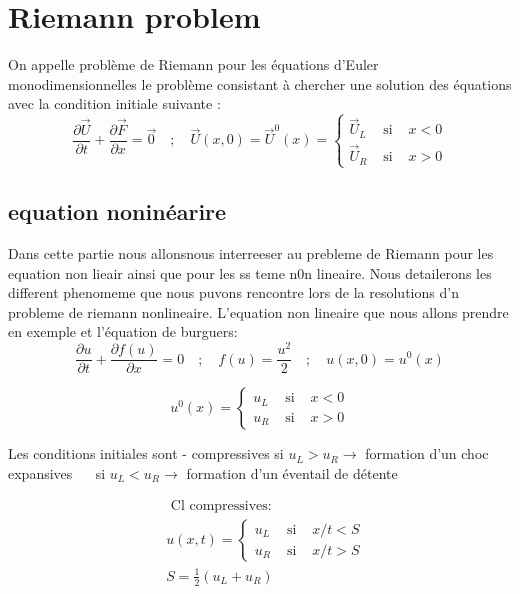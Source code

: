 \section{Riemann problem}

On appelle problème de Riemann pour les équations d'Euler monodimensionnelles le problème consistant à chercher une solution des équations avec la condition initiale suivante :
\begin{equation}
\frac{\partial \vec{U}}{\partial t}+\frac{\partial \vec{F}}{\partial x}=\overrightarrow{0} \quad ; \quad \vec{U}(x, 0)=\vec{U}^{0}(x)=\left\{\begin{array}{lll}
\vec{U}_{L} & \text { si } & x<0 \\
\vec{U}_{R} & \text { si } & x>0
\end{array}\right.
\end{equation}
\subsection{equation noninéarire}
Dans cette partie nous allonsnous interreeser au prebleme de Riemann pour les equation non lieair ainsi que pour les ss teme n0n lineaire. Nous detailerons les different phenomeme que nous puvons rencontre lors de la resolutions d'n probleme de riemann nonlineaire. L'equation non lineaire que nous allons prendre en exemple et l'équation de burguers:
\begin{equation}
\frac{\partial u}{\partial t}+\frac{\partial f(u)}{\partial x}=0 \quad ; \quad f(u)=\frac{u^{2}}{2} \quad ; \quad u(x, 0)=u^{0}(x)
\end{equation}

\begin{equation}
u^{0}(x)=\left\{\begin{array}{lll}
u_{L} & \text { si } & x<0 \\
u_{R} & \text { si } & x>0
\end{array}\right.
\end{equation}

Les conditions initiales sont
- compressives si $u_{L}>u_{R} \rightarrow$ formation d'un choc expansives $\quad$ si $u_{L}<u_{R} \rightarrow$ formation d'un éventail de détente

\begin{equation}
\begin{aligned}
&\text { Cl compressives: }\\
&u(x, t)=\left\{\begin{array}{lll}
u_{L} & \text { si } & x / t<S \\
u_{R} & \text { si } & x / t>S
\end{array}\right.\\
&S=\frac{1}{2}\left(u_{L}+u_{R}\right)
\end{aligned}
\end{equation}

